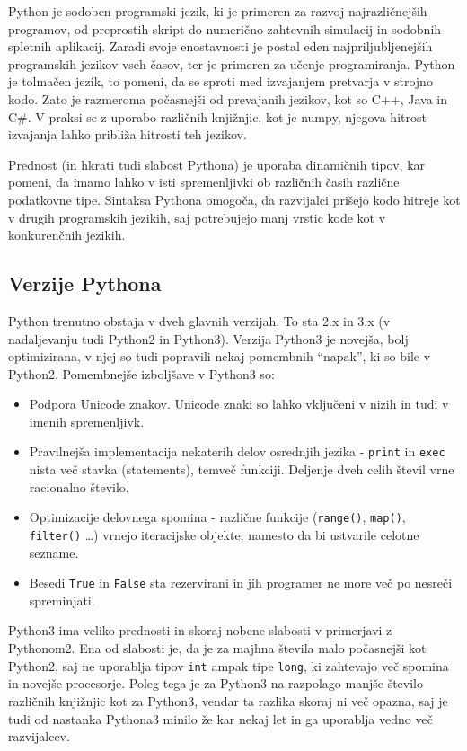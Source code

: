 Python je sodoben programski jezik, ki je primeren za razvoj najrazličnejših programov, od preprostih skript do numerično zahtevnih simulacij in sodobnih spletnih aplikacij. Zaradi svoje enostavnosti je postal eden najpriljubljenejših programskih jezikov vseh časov, ter je primeren za učenje programiranja. Python je tolmačen jezik, to pomeni, da se sproti med izvajanjem pretvarja v strojno kodo.\cite{rin} Zato je razmeroma počasnejši od prevajanih jezikov, kot so C++, Java in C\#. V praksi se z uporabo različnih knjižnjic, kot je numpy, njegova hitrost izvajanja lahko približa hitrosti teh jezikov.

Prednost (in hkrati tudi slabost Pythona) je uporaba dinamičnih tipov, kar pomeni, da imamo lahko v isti spremenljivki ob različnih časih različne podatkovne tipe. Sintaksa Pythona omogoča, da razvijalci prišejo kodo hitreje kot v drugih programskih jezikih, saj potrebujejo manj vrstic kode kot v konkurenčnih jezikih.

\subsection{Verzije Pythona}
    Python trenutno obstaja v dveh glavnih verzijah. To sta 2.x in 3.x (v nadaljevanju tudi Python2 in Python3). Verzija Python3 je novejša, bolj optimizirana, v njej so tudi popravili nekaj pomembnih ``napak'', ki so bile v Python2. Pomembnejše izboljšave v Python3 so:
    \begin{itemize}
        \item Podpora Unicode znakov. Unicode znaki so lahko vključeni v nizih in tudi v imenih spremenljivk.
        \item Pravilnejša implementacija nekaterih delov osrednjih jezika - \texttt{print} in \texttt{exec} nista več stavka (statements), temveč funkciji. Deljenje dveh celih števil vrne racionalno število.
        \item Optimizacije delovnega spomina - različne funkcije (\texttt{range()}, \texttt{map()}, \texttt{filter()} \ldots) vrnejo iteracijske objekte, namesto da bi ustvarile celotne sezname.
        \item Besedi \texttt{True} in \texttt{False} sta rezervirani in jih programer ne more več po nesreči spreminjati.
    \end{itemize}

    Python3 ima veliko prednosti in skoraj nobene slabosti v primerjavi z Pythonom2. Ena od slabosti je, da je za majhna števila malo počasnejši kot Python2, saj ne uporablja tipov \texttt{int} ampak tipe \texttt{long}, ki zahtevajo več spomina in novejše procesorje. Poleg tega je za Python3 na razpolago manjše število različnih knjižnjic kot za Python3, vendar ta razlika skoraj ni več opazna, saj je tudi od nastanka Pythona3 minilo že kar nekaj let in ga uporablja vedno več razvijalcev.

